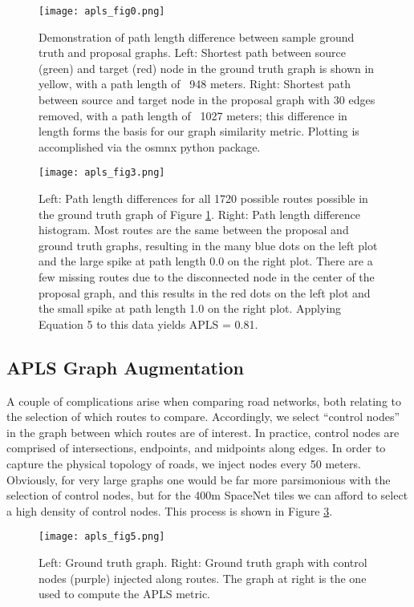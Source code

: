 \documentclass{article}
\begin{document}
\begin{figure}[h]
  \centering
     \texttt{[image: apls\_fig0.png]}
  \caption{Demonstration of path length difference between sample ground truth and proposal graphs. Left: Shortest path between source (green) and target (red) node in the ground truth graph is shown in yellow, with a path length of ~948 meters. Right: Shortest path between source and target node in the proposal graph with 30 edges removed, with a path length of ~1027 meters; this difference in length forms the basis for our graph similarity metric. Plotting is accomplished via the osmnx python package.}
  \label{fig:apls_fig0}
\end{figure}

\begin{figure}[h]
  \centering
     \texttt{[image: apls\_fig3.png]}
  \caption{Left: Path length differences for all 1720 possible routes possible in the ground truth graph of Figure \ref{fig:apls_fig0}. Right: Path length difference histogram. Most routes are the same between the proposal and ground truth graphs, resulting in the many blue dots on the left plot and the large spike at path length 0.0 on the right plot. There are a few missing routes due to the disconnected node in the center of the proposal graph, and this results in the red dots on the left plot and the small spike at path length 1.0 on the right plot. Applying Equation 5 to this data yields APLS = 0.81.}
  \label{fig:apls_fig3}
\end{figure}

\subsection{APLS Graph Augmentation}
A couple of complications arise when comparing road networks, both relating to the selection of which routes to compare. Accordingly, we select ``control nodes'' in the graph between which routes are of interest.  In practice, control nodes are comprised of intersections, endpoints, and midpoints along edges.  In order to capture the physical topology of roads, we inject nodes every 50 meters.  Obviously, for very large graphs one would be far more parsimonious with the selection of control nodes, but for the 400m SpaceNet tiles we can afford to select a high density of control nodes.  This process is shown in Figure  \ref{fig:apls_fig5}.

\begin{figure}[h]
  \centering
     \texttt{[image: apls\_fig5.png]}
  \caption{Left: Ground truth graph.  Right: Ground truth graph with control nodes (purple) injected along routes.  The graph at right is the one used to compute the APLS metric. }
  \label{fig:apls_fig5}
\end{figure}
\end{document}
